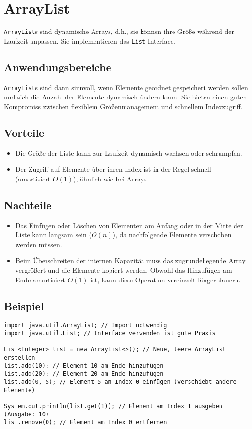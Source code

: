 \section{ArrayList}
\texttt{ArrayList}s sind dynamische Arrays, d.h., sie können ihre Größe während der Laufzeit anpassen. Sie implementieren das \texttt{List}-Interface.

\subsection{Anwendungsbereiche}
\texttt{ArrayList}s sind dann sinnvoll, wenn Elemente geordnet gespeichert werden sollen und sich die Anzahl der Elemente dynamisch ändern kann. Sie bieten einen guten Kompromiss zwischen flexiblem Größenmanagement und schnellem Indexzugriff.

\subsection{Vorteile}
\begin{itemize}
    \item Die Größe der Liste kann zur Laufzeit dynamisch wachsen oder schrumpfen.
    \item Der Zugriff auf Elemente über ihren Index ist in der Regel schnell (amortisiert
          $O(1)$), ähnlich wie bei Arrays.
\end{itemize}

\subsection{Nachteile}
\begin{itemize}
    \item Das Einfügen oder Löschen von Elementen am Anfang oder in der Mitte der Liste
          kann langsam sein ($O(n)$), da nachfolgende Elemente verschoben werden müssen.
    \item Beim Überschreiten der internen Kapazität muss das zugrundeliegende Array
          vergrößert und die Elemente kopiert werden. Obwohl das Hinzufügen am Ende
          amortisiert $O(1)$ ist, kann diese Operation vereinzelt länger dauern.
\end{itemize}

\subsection{Beispiel}
\begin{lstlisting}[caption={Beispiel für die Verwendung einer ArrayList in Java}, label=lst:arrayListExample]
import java.util.ArrayList; // Import notwendig
import java.util.List; // Interface verwenden ist gute Praxis

List<Integer> list = new ArrayList<>(); // Neue, leere ArrayList erstellen
list.add(10); // Element 10 am Ende hinzufügen
list.add(20); // Element 20 am Ende hinzufügen
list.add(0, 5); // Element 5 am Index 0 einfügen (verschiebt andere Elemente)

System.out.println(list.get(1)); // Element am Index 1 ausgeben (Ausgabe: 10)
list.remove(0); // Element am Index 0 entfernen
\end{lstlisting}

